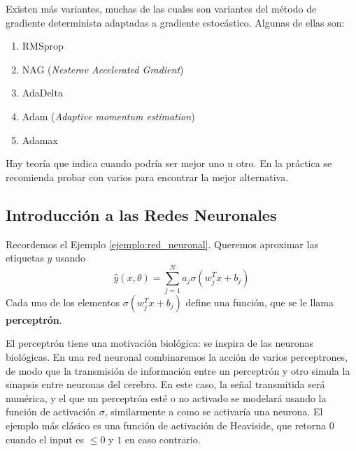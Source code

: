 Existen más variantes, muchas de las cuales son variantes del método de gradiente determinista adaptadas a gradiente estocástico. Algunas de ellas son:
\begin{enumerate}
    \item RMSprop
    \item NAG (\textit{Nesterov Accelerated Gradient})
    \item AdaDelta
    \item Adam (\textit{Adaptive momentum estimation})
    \item Adamax
\end{enumerate}
Hay teoría que indica cuando podría ser mejor uno u otro. En la práctica se recomienda probar con varios para encontrar la mejor alternativa.

\subsection{Introducción a las Redes Neuronales}
Recordemos el Ejemplo \ref{ejemplo:red_neuronal}. Queremos aproximar las etiquetas $y$ usando
$$ \hat{y}(x,\theta) = \displaystyle \sum^N_{j=1}a_j\sigma(w_j^Tx+b_j) $$
Cada uno de los elementos $\sigma(w_j^Tx+b_j)$ define una función, que se le llama \textbf{perceptrón}. 

\newp El perceptrón tiene una motivación biológica: se inspira de las neuronas biológicas. En una red neuronal combinaremos la acción de varios perceptrones, de modo que la transmisión de información entre un perceptrón y otro simula la sinapsis entre neuronas del cerebro. En este caso, la señal transmitida será numérica, y el que un perceptrón esté o no activado se modelará usando la función de activación $\sigma$, similarmente a como se activaría una neurona. El ejemplo más clásico es una función de activación de Heaviside, que retorna $0$ cuando el input es $\leq 0$ y $1$ en caso contrario.

